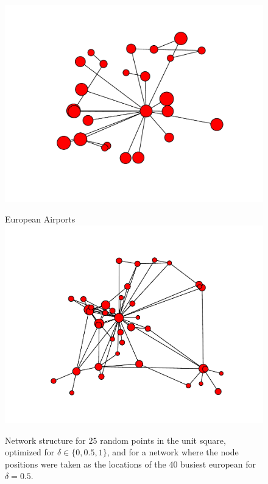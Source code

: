 \documentclass{scrartcl}
\begin{document}
\begin{figure}[htbp]
\begin{minipage}[b]{.45\linewidth}
	\includegraphics[width=\textwidth]{pictures/d10.pdf}
	\end{minipage} \nolinebreak
	\begin{minipage}[b]{.45\linewidth}
	\centering
	European Airports
	\includegraphics[width=\textwidth]{pictures/europe.pdf}
	\end{minipage}
	\caption{Network structure for $25$ random points in the unit square, optimized for $\delta \in \{0, 0.5, 1\}$, and for a network where the node positions were taken as the locations of the 40 busiest european for $\delta = 0.5$. }
	\label{fig:motifs}
\end{figure}


\clearpage 
\end{document}
